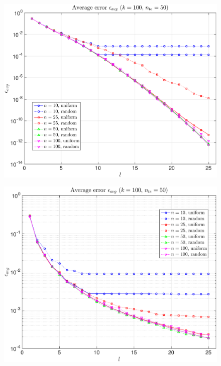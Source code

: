 \documentclass[11pt,a4paper]{article}
\theoremstyle{definition}
\theoremstyle{theorem}
\begin{document}
	\begin{figure}
		\center
		\includegraphics[scale=0.5]{fig3}
		\caption{}
	\end{figure}
	
	\begin{figure}
		\center
		\includegraphics[scale=0.5]{fig4}
		\caption{}
	\end{figure}
	
\end{document}
